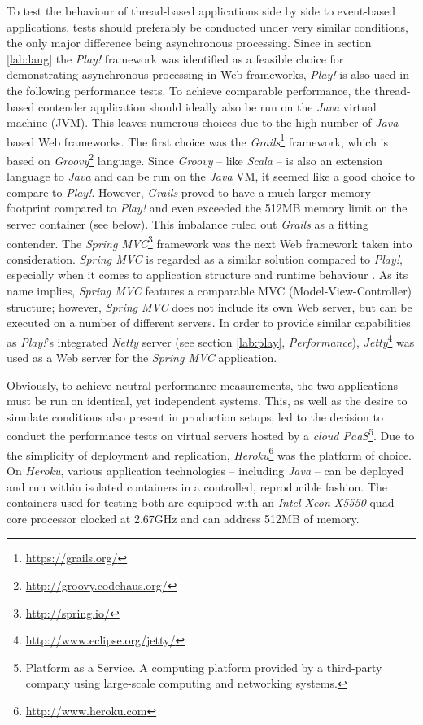 To test the behaviour of thread-based applications side by side to event-based applications, tests should preferably be conducted under very similar conditions, the only major difference being asynchronous processing. Since in section \ref{lab:lang} the \textit{Play!} framework was identified as a feasible choice for demonstrating asynchronous processing in Web frameworks, \textit{Play!} is also used in the following performance tests. To achieve comparable performance, the thread-based contender application should ideally also be run on the \textit{Java} virtual machine (JVM). This leaves numerous choices due to the high number of \textit{Java}-based Web frameworks. The first choice was the \textit{Grails}\footnote{\url{https://grails.org/}} framework, which is based on \textit{Groovy}\footnote{\url{http://groovy.codehaus.org/}} language. Since \textit{Groovy} -- like \textit{Scala} -- is also an extension language to \textit{Java} and can be run on the \textit{Java} VM, it seemed like a good choice to compare to \textit{Play!}. However, \textit{Grails} proved to have a much larger memory footprint compared to \textit{Play!} and even exceeded the 512MB memory limit on the server container (see below). This imbalance ruled out \textit{Grails} as a fitting contender. The \textit{Spring MVC}\footnote{\url{http://spring.io/}} framework was the next Web framework taken into consideration. \textit{Spring MVC} is regarded as a similar solution compared to \textit{Play!}, especially when it comes to application structure and runtime behaviour \cite[p. 109]{Scala}. As its name implies, \textit{Spring MVC} features a comparable MVC (Model-View-Controller) structure; however, \textit{Spring MVC} does not include its own Web server, but can be executed on a number of different servers. In order to provide similar capabilities as \textit{Play!}'s integrated \textit{Netty} server (see section \ref{lab:play}, \textit{Performance}), \textit{Jetty}\footnote{\url{http://www.eclipse.org/jetty/}} was used as a Web server for the \textit{Spring MVC} application.

Obviously, to achieve neutral performance measurements, the two applications must be run on identical, yet independent systems. This, as well as the desire to simulate conditions also present in production setups, led to the decision to conduct the performance tests on virtual servers hosted by a \textit{cloud PaaS}\footnote{Platform as a Service. A computing platform provided by a third-party company using large-scale computing and networking systems.}. Due to the simplicity of deployment and replication, \textit{Heroku}\footnote{\url{http://www.heroku.com}} was the platform of choice. On \textit{Heroku}, various application technologies -- including \textit{Java} -- can be deployed and run within isolated containers in a controlled, reproducible fashion. The containers used for testing both are equipped with an \textit{Intel Xeon X5550} quad-core processor clocked at 2.67GHz and can address 512MB of memory.

